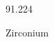 \documentclass[12pt]{article}
\begin{document}
\hfill{}
\vfill
\begin{center}
  {\fontsize{50}{60}
  }

  \vspace{1em}

  91.224

Zirconium
\end{center}
\vfill
\end{document}

